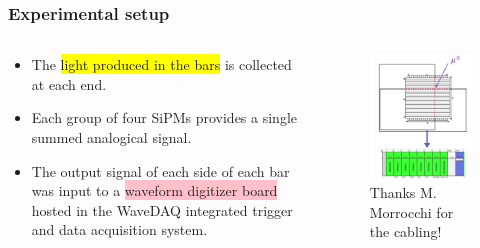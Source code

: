 \begin{frame} [fragile]
	\frametitle{Experimental setup}
	\begin{columns}
  		\begin{column}{0.50\textwidth}
            \begin{itemize}
                \item The \colorbox{yellow}{light produced in the bars} is collected at each end.
                \item Each group of four SiPMs provides a single summed analogical signal.
                \item The output signal of each side of each bar was input to a \colorbox{pink}{waveform digitizer board} hosted in the WaveDAQ integrated trigger and data acquisition system.
            \end{itemize}
		\end{column}
    \begin{column}{0.50\textwidth}
 		\newline
			\begin{figure}
	  		    \centering
				\includegraphics[scale=0.25]{figures/setup.png}
                \caption{Thanks M. Morrocchi for the cabling!}
			\end{figure}
    \end{column}
\end{columns}
\end{frame}